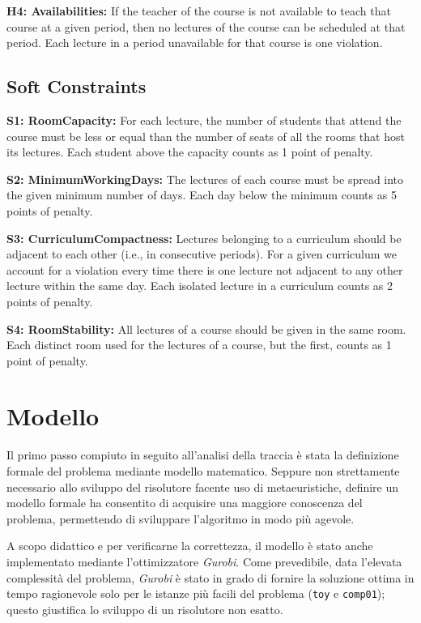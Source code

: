 \documentclass[]{article}
\begin{document}
\textbf{H4: Availabilities:} If the teacher of the course is not available to teach that course at a given
period, then no lectures of the course can be scheduled at that period. Each lecture in
a period unavailable for that course is one violation.

\subsection{Soft Constraints}

\textbf{S1: RoomCapacity:} For each lecture, the number of students that attend the course must be
less or equal than the number of seats of all the rooms that host its lectures.
Each student above the capacity counts as 1 point of penalty.

\textbf{S2: MinimumWorkingDays:} The lectures of each course must be spread into the given 
minimum number of days. Each day below the minimum counts as 5 points of penalty.

\textbf{S3: CurriculumCompactness:} Lectures belonging to a curriculum should be adjacent to each
other (i.e., in consecutive periods). For a given curriculum we account for a violation
every time there is one lecture not adjacent to any other lecture within the same day.
Each isolated lecture in a curriculum counts as 2 points of penalty.

\textbf{S4: RoomStability:} All lectures of a course should be given in the same room. 
Each distinct room used for the lectures of a course, but the first, counts as 1 point of penalty.


\section{Modello}

Il primo passo compiuto in seguito all'analisi della traccia è stata la definizione formale del problema mediante modello matematico. Seppure non strettamente necessario allo sviluppo del risolutore facente uso di metaeuristiche, definire un modello formale ha consentito di acquisire una maggiore conoscenza del problema, permettendo di sviluppare l'algoritmo in modo più agevole.

A scopo didattico e per verificarne la correttezza, il modello è stato anche implementato mediante l'ottimizzatore \textit{Gurobi}.
Come prevedibile, data l'elevata complessità del problema, \textit{Gurobi} è stato in grado di fornire la soluzione ottima in tempo ragionevole solo per le istanze più facili del problema (\texttt{toy}  e \texttt{comp01}); questo giustifica lo sviluppo di un risolutore non esatto.
\end{document}
